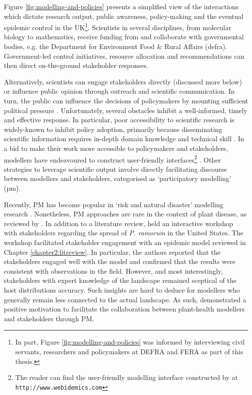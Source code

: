 Figure \ref{fig:modelling-and-policies} presents a simplified view of the interactions which dictate research output, public awareness, 
policy-making and the eventual epidemic control in the UK\footnote{
In part, Figure \ref{fig:modelling-and-policies} was informed by interviewing civil servants, researchers and policymakers at DEFRA and FERA as part of this thesis.}. Scientists in several disciplines,
from molecular biology to mathematics, receive funding from and collaborate with governmental
bodies, e.g. the Department for Environment Food \& Rural Affairs (\acrshort{defra}). Government-led control initiatives, resource
allocation and recommendations can then direct on-the-ground stakeholder
responses. 

Alternatively, scientists can engage stakeholders directly (discussed more below) or influence public opinion through outreach and
scientific communication. In turn, the public can influence the decisions of policymakers by
mounting sufficient political pressure \cite{fuller2016public}.
Unfortunately, several obstacles inhibit a well-informed, timely and effective response. 
In particular, poor accessibility to scientific research is widely-known to inhibit policy adoption, 
primarily because disseminating scientific information requires in-depth domain knowledge and technical skill \cite{jones2020modelling}.
In a bid to make their work more accessible to policymakers and stakeholders, modellers have endeavoured to construct user-friendly interfaces\footnote{
The reader can find the user-friendly modelling interface constructed by \cite{WEBIDEMICS} at \nolinkurl{http://www.webidemics.com}} \cite{WEBIDEMICS}.
Other strategies to leverage scientific output involve directly facilitating discourse between modellers and stakeholders, categorised as `participatory modelling' (\acrshort{pm}).

Recently, PM has become popular in `risk and natural disaster' modelling research \cite{hamalainen2020leadership, ravera2020participatory, hedelin2017participatory}.
Nonetheless, PM approaches are rare in the context of plant disease, as reviewed by \cite{gaydos2019forecasting}.
In addition to a literature review, \cite{gaydos2019forecasting} held an interactive workshop with stakeholders
regarding the spread of \textit{P. ramorum} in the United States. The workshop facilitated stakeholder engagement
with an epidemic model \cite{tonini2017tangible}\textemdash reviewed in Chapter \ref{chapter2:litreview}. In particular, the authors reported
that the stakeholders engaged well with the model and confirmed that the results were consistent with observations in the field. However, and most interestingly, stakeholders with expert knowledge of the landscape remained sceptical of the host distributions accuracy. 
Such insights are hard to deduce for modellers who generally remain less connected to the actual landscape. 
As such, \cite{tonini2017tangible} demonstrated a positive motivation to facilitate the collaboration 
between plant-health modellers and stakeholders through PM.

